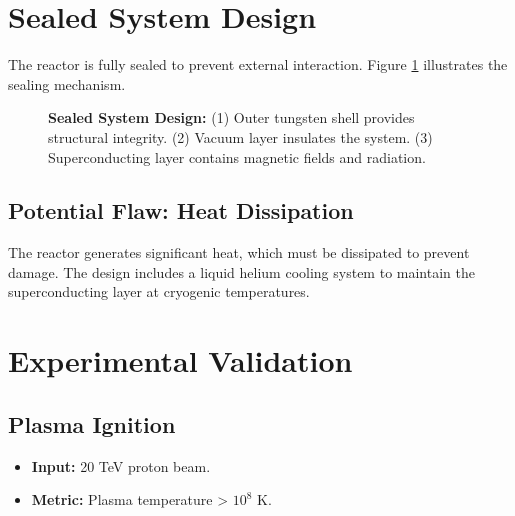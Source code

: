 \documentclass[12pt, a4paper]{article}
\begin{document}
\section{Sealed System Design}
The reactor is fully sealed to prevent external interaction. Figure \ref{fig:sealed_system} illustrates the sealing mechanism.

\begin{figure}[H]
\centering
{}
\caption{
\textbf{Sealed System Design:} 
(1) Outer tungsten shell provides structural integrity. 
(2) Vacuum layer insulates the system. 
(3) Superconducting layer contains magnetic fields and radiation.
}
\label{fig:sealed_system}
\end{figure}

\subsection{Potential Flaw: Heat Dissipation}
The reactor generates significant heat, which must be dissipated to prevent damage. The design includes a liquid helium cooling system to maintain the superconducting layer at cryogenic temperatures.

\section{Experimental Validation}
\subsection{Plasma Ignition}
\begin{itemize}
\item \textbf{Input:} 20 TeV proton beam.
\item \textbf{Metric:} Plasma temperature > $10^8$ K.
\end{itemize}
\end{document}
